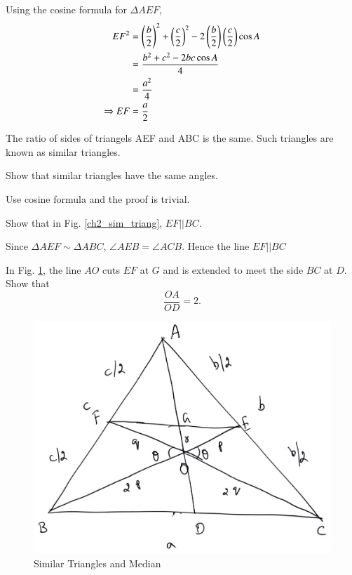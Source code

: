 \proof Using the cosine formula for $\Delta AEF$,
%
\begin{align}
EF^2 &= \left(\frac{b}{2}\right)^2 + \left(\frac{c}{2}\right)^2 - 2 \left(\frac{b}{2}\right)\left(\frac{c}{2}\right) \cos A \\
&= \frac{b^2 + c^2 - 2bc \cos A}{4} \\
&= \frac{a^2}{4} \\
\Rightarrow EF &= \frac{a}{2}
\end{align}
%
\begin{definition}
	The ratio of sides of triangels AEF and ABC is the same.  Such triangles are known as similar triangles.
\end{definition}
\begin{problem}
	Show that similar triangles have the same angles.
\end{problem}
\proof Use cosine formula and the proof is trivial.
\begin{problem}
	Show that in Fig. \ref{ch2_sim_triang}, $EF || BC$.
\end{problem}
\proof Since $\Delta AEF \sim \Delta ABC$, $\angle AEB = \angle ACB$.  Hence the line $EF||BC$
%
%
\begin{problem}
	In Fig. \ref{ch2_median_3}, the line $AO$ cuts $EF$ at $G$ and is extended to meet the side $BC$ at $D$.  Show that 
	\begin{equation}
	\frac{OA}{OD} = 2.
	\end{equation}
\end{problem}
\begin{figure}[!h]
	\begin{center}
		
		\includegraphics[width=\columnwidth]{./figs/ch2_median_3}
		\vspace*{-10cm}
	\end{center}
	\caption{Similar Triangles and Median}
	\label{ch2_median_3}	
\end{figure}

